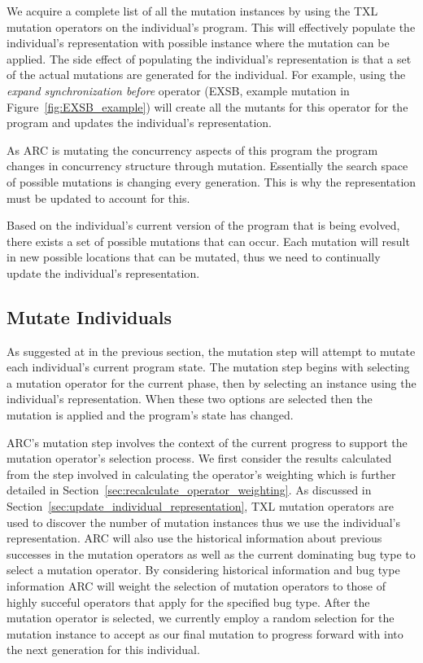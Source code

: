 \documentclass[10pt, conference, compsocconf]{IEEEtran}
\begin{document}
We acquire a complete list of all the mutation instances by using the TXL
mutation operators on the individual's program. This will effectively populate
the individual's representation with possible instance where the mutation can
be applied. The side effect of populating the individual's representation is
that a set of the actual mutations are generated for the individual. For
example, using the \textit{expand synchronization before} operator (EXSB,
example mutation in Figure~\ref{fig:EXSB_example}) will create all the mutants
for this operator for the program and updates the individual's representation.

As ARC is mutating the concurrency aspects of this program the program changes
in concurrency structure through mutation. Essentially the search space of
possible mutations is changing every generation. This is why the representation
must be updated to account for this.

Based on the individual's current version of the program that is being evolved,
there exists a set of possible mutations that can occur. Each mutation will
result in new possible locations that can be mutated, thus we need to
continually update the individual's representation.

\subsection{Mutate Individuals}
\label{sec:mutate_individuals}

As suggested at in the previous section, the mutation step will attempt to
mutate each individual's current program state. The mutation step begins with
selecting a mutation operator for the current phase, then by selecting an
instance using the individual's representation. When these two options are
selected then the mutation is applied and the program's state has changed.

ARC's mutation step involves the context of the current progress to support the
mutation operator's selection process. We first consider the results calculated
from the step involved in calculating the operator's weighting which is further
detailed in Section~\ref{sec:recalculate_operator_weighting}. As discussed in
Section~\ref{sec:update_individual_representation}, TXL mutation operators are used
to discover the number of mutation instances thus we use the individual's
representation.  ARC will also use the historical information about previous
successes in the mutation operators as well as the current dominating bug type
to select a mutation operator. By considering historical information and bug
type information ARC will weight the selection of mutation operators to those
of highly succeful operators that apply for the specified bug type. After the
mutation operator is selected, we currently employ a random selection for the
mutation instance to accept as our final mutation to progress forward with into
the next generation for this individual.
\end{document}

